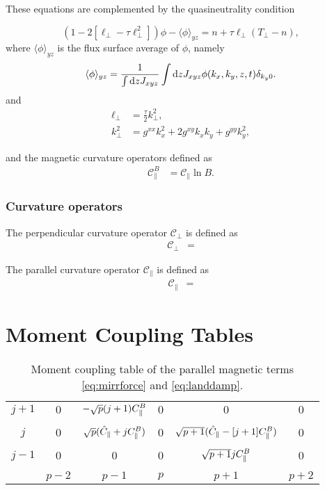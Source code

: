 \documentclass{article}
\begin{document}
These equations are complemented by the quasineutrality condition

\begin{equation}
\left(1 - 2\left[\ell_\perp - \tau\ell_\perp^2\right]\right)\phi - \langle\phi\rangle_{yz} = n + \tau\ell_\perp(T_\perp - n),
\end{equation}
where $\langle \phi \rangle_{yz}$ is the flux surface average of $\phi$, namely
\begin{equation}
    \langle \phi \rangle_{yz} = \frac{1}{\int\mathrm dz J_{xyz}}\int\mathrm dz J_{xyz}\phi(k_x,k_y,z,t)\delta_{k_y0}.
\end{equation}
and
\begin{align}
\ell_\perp &= \frac{\tau}{2} k_\perp^2,\\
k_\perp^2 &= g^{xx}k_x^2 + 2g^{xy}k_x k_y + g^{yy}k_y^2,
\end{align}

and the magnetic curvature operators defined as
\begin{align}
\mathcal{C}_\parallel^{B} &= \mathcal{C}_\parallel\ln B.
\end{align}

\subsubsection*{Curvature operators}
The perpendicular curvature operator $\mathcal{C}_\perp$ is defined as
\begin{align}
\mathcal{C}_\perp &=
\end{align}

The parallel curvature operator $\mathcal{C}_\parallel$ is defined as
\begin{align}
\mathcal{C}_\parallel &=
\end{align}

\newpage
\appendix
\section{Moment Coupling Tables}

\begin{table}[h]
    \centering
    \begin{tabular}{c|ccccc}
    $j+1$ & $0$ & $-\sqrt{p}(j+1)C_{\parallel}^{B}$ & $0$ & $0$ & $0$ \\
    & & & & & \\
    $j$   & $0$ & $\sqrt{p}(\hat C_{\parallel} + j C_{\parallel}^{B})$ & $0$ & $\sqrt{p+1}(\hat C_{\parallel} - [j+1]C_{\parallel}^{B})$ & $0$ \\
    & & & & & \\
    $j-1 $& $0$ & $0$ & $0$ & $\sqrt{p+1}jC_{\parallel}^{B}$ & $0$ \\
    & & & & & \\
    \hline
          & $p-2$ & $p-1$ & $p$ & $p+1$ & $p+2$
    \end{tabular}
    \caption{Moment coupling table of the parallel magnetic terms \eqref{eq:mirrforce} and \eqref{eq:landdamp}.}
    \label{tab:moment_coupling_parallel}
    \end{table}
    
\end{document}
